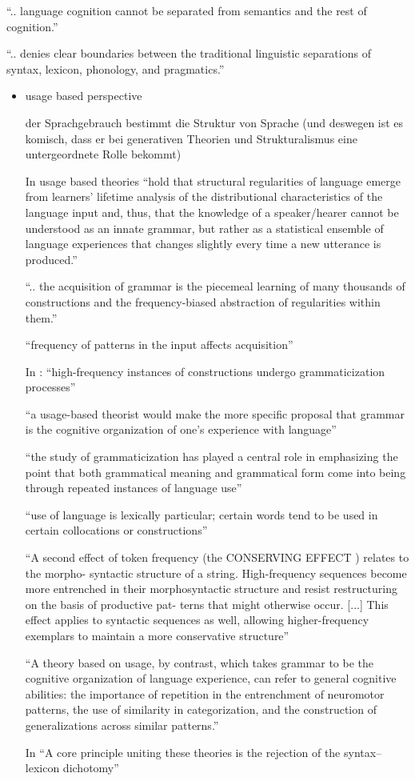 ``.. language cognition cannot be separated from semantics and the rest of cognition.''

``.. denies clear boundaries between the traditional linguistic separations of syntax, lexicon, phonology, and pragmatics.''
\begin{itemize}
    \item usage based perspective

        der Sprachgebrauch bestimmt die Struktur von Sprache (und deswegen ist es komisch, dass er bei generativen Theorien und Strukturalismus eine untergeordnete Rolle bekommt)

        In \cite{Ellis08} usage based theories ``hold that structural regularities of language emerge from learners' lifetime analysis of the distributional characteristics of the language input and, thus, that the knowledge of a speaker/hearer cannot be understood as an innate grammar, but rather as a statistical ensemble of language experiences that changes slightly every time a new utterance is produced.''

        ``.. the acquisition of grammar is the piecemeal learning of many thousands of constructions and the frequency-biased abstraction of regularities within them.''

        ``frequency of patterns in the input affects acquisition''

        In \cite{Bybee06}: ``high-frequency instances of constructions undergo grammaticization processes''

        ``a usage-based theorist would make the more specific proposal that grammar
        is the cognitive organization of one’s experience with language''

        ``the study of grammaticization has played a central role in emphasizing
        the point that both grammatical meaning and grammatical form come into being through
        repeated instances of language use''

        ``use of language is lexically particular;
        certain words tend to be used in certain collocations or constructions''

        ``A second effect of token frequency (the
        CONSERVING EFFECT
        ) relates to the morpho-
        syntactic structure of a string. High-frequency sequences become more entrenched in
        their morphosyntactic structure and resist restructuring on the basis of productive pat-
        terns that might otherwise occur.  [...]
        This effect applies to syntactic sequences as well, allowing
        higher-frequency exemplars to maintain a more conservative structure''

        ``A theory based on usage, by contrast, which takes grammar
        to be the cognitive organization of language experience, can refer to general cognitive
        abilities: the importance of repetition in the entrenchment of neuromotor patterns, the
        use of similarity in categorization, and the construction of generalizations across similar
        patterns.''

        In \cite{Eskildsen08} ``A core principle uniting these theories is the rejection of the syntax–lexicon
        dichotomy''
\end{itemize}


